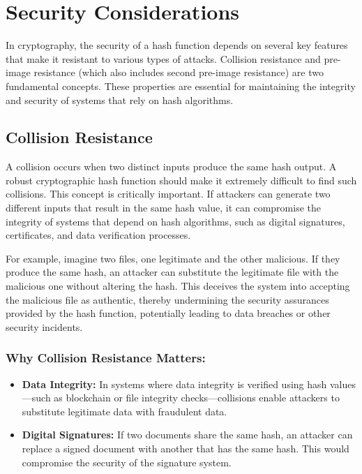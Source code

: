 \documentclass[11pt,a4paper]{article}
\begin{document}
\section*{Security Considerations}
In cryptography, the security of a hash function depends on several key features that make it resistant to various types of attacks. Collision resistance and pre-image resistance (which also includes second pre-image resistance) are two fundamental concepts. These properties are essential for maintaining the integrity and security of systems that rely on hash algorithms.

    \subsection*{Collision Resistance}
    A collision occurs when two distinct inputs produce the same hash output. A robust cryptographic hash function should make it extremely difficult to find such collisions. This concept is critically important. If attackers can generate two different inputs that result in the same hash value, it can compromise the integrity of systems that depend on hash algorithms, such as digital signatures, certificates, and data verification processes.

    For example, imagine two files, one legitimate and the other malicious. If they produce the same hash, an attacker can substitute the legitimate file with the malicious one without altering the hash. This deceives the system into accepting the malicious file as authentic, thereby undermining the security assurances provided by the hash function, potentially leading to data breaches or other security incidents.

        \subsubsection*{Why Collision Resistance Matters:}
        \begin{itemize}
                \item \textbf{Data Integrity:} In systems where data integrity is verified using hash values—such as blockchain or file integrity checks—collisions enable attackers to substitute legitimate data with fraudulent data.
                
                \item \textbf{Digital Signatures:} If two documents share the same hash, an attacker can replace a signed document with another that has the same hash. This would compromise the security of the signature system.
        \end{itemize}
\end{document}
